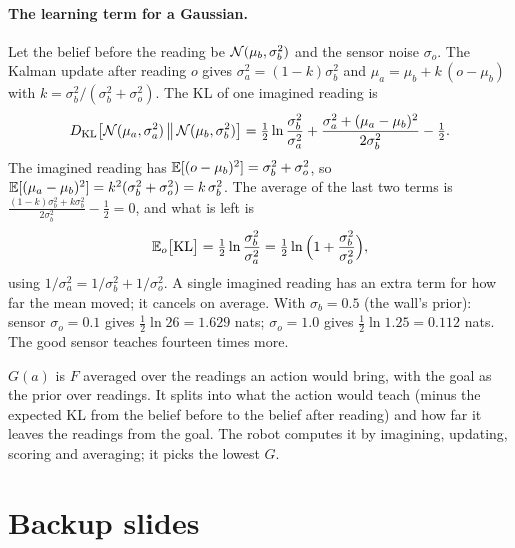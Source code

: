 \documentclass[11pt]{article}
\begin{document}
\paragraph{The learning term for a Gaussian.} Let the belief before the reading be $\mathcal{N}(\mu_b,\sigma_b^2)$ and the sensor noise $\sigma_o$. The Kalman update after reading $o$ gives $\sigma_a^2 = (1-k)\sigma_b^2$ and $\mu_a = \mu_b + k\,(o-\mu_b)$ with $k = \sigma_b^2/(\sigma_b^2+\sigma_o^2)$. The KL of one imagined reading is
\[
D_{\mathrm{KL}}\!\left[\mathcal{N}(\mu_a,\sigma_a^2)\,\middle\|\,\mathcal{N}(\mu_b,\sigma_b^2)\right] = \tfrac12\ln\frac{\sigma_b^2}{\sigma_a^2} + \frac{\sigma_a^2 + (\mu_a-\mu_b)^2}{2\sigma_b^2} - \tfrac12 .
\]
The imagined reading has $\mathbb{E}[(o-\mu_b)^2] = \sigma_b^2 + \sigma_o^2$, so $\mathbb{E}[(\mu_a-\mu_b)^2] = k^2(\sigma_b^2+\sigma_o^2) = k\,\sigma_b^2$. The average of the last two terms is $\frac{(1-k)\sigma_b^2 + k\sigma_b^2}{2\sigma_b^2} - \tfrac12 = 0$, and what is left is
\[
\mathbb{E}_o\big[\mathrm{KL}\big] = \tfrac12\ln\frac{\sigma_b^2}{\sigma_a^2} = \tfrac12\ln\Big(1 + \frac{\sigma_b^2}{\sigma_o^2}\Big),
\]
using $1/\sigma_a^2 = 1/\sigma_b^2 + 1/\sigma_o^2$. A single imagined reading has an extra term for how far the mean moved; it cancels on average. With $\sigma_b = 0.5$ (the wall's prior): sensor $\sigma_o = 0.1$ gives $\tfrac12\ln 26 = 1.629$ nats; $\sigma_o = 1.0$ gives $\tfrac12\ln 1.25 = 0.112$ nats. The good sensor teaches fourteen times more.

\begin{keyidea}
$G(a)$ is $F$ averaged over the readings an action would bring, with the goal as the prior over readings. It splits into what the action would teach (minus the expected KL from the belief before to the belief after reading) and how far it leaves the readings from the goal. The robot computes it by imagining, updating, scoring and averaging; it picks the lowest $G$.
\end{keyidea}

\section{Backup slides}
\end{document}
